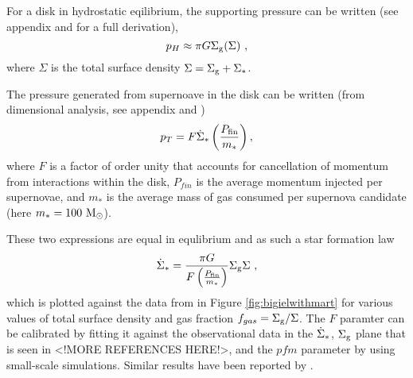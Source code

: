 For a disk in hydrostatic eqilibrium, the supporting pressure can be written (see appendix and \citet{ostriker2011} for a full derivation),
\begin{equation}
\label{eqn:hydeq}
p_H \approx \pi G \Sigma_\mathrm{g} (\Sigma)~,
\end{equation}
where $\Sigma$ is the total surface density $\Sigma = \Sigma_\mathrm{g} + \Sigma_*$.

The pressure generated from supernoave in the disk can be written (from dimensional analysis, see appendix and \citet{martizzi2015})
\begin{equation}
\label{eqn:turb}
p_T = F \dot{\Sigma}_* \left(\frac{P_\mathrm{fin}}{m_*}\right),
\end{equation}
where $F$ is a factor of order unity that accounts for cancellation of momentum from interactions within the disk, $P_{fin}$ is the average momentum injected per supernovae, and $m_*$ is the average mass of gas consumed per supernova candidate (here $m_* = 100 ~\mathrm{M}_{\odot}$).

These two expressions are equal in equlibrium and as such a star formation law
\begin{equation}
\label{eqn:martsfr}
\dot{\Sigma}_* = \frac{\pi G}{F \left(\frac{P_\mathrm{fin}}{m_*}\right)} \Sigma_\mathrm{g} \Sigma~,
\end{equation}
which is plotted against the data from \citet{bigiel2008} in Figure \ref{fig:bigielwithmart} for various values of total surface density and gas fraction $f_{gas} = \Sigma_\mathrm{g}/\Sigma$.
The $F$ paramter can be calibrated by fitting it against the observational data in the $\dot{\Sigma}_*$, $\Sigma_\mathrm{g}$ plane that is seen in \citet{bigiel2008} <!MORE REFERENCES HERE!>, and the $pfm$ parameter by using small-scale simulations.
Similar results have been reported by \citep{ostriker2011}.

